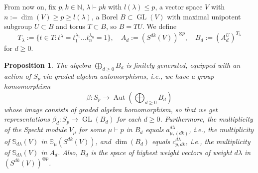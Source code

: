 \documentclass[a4paper]{amsart}
\newtheorem{proposition}{Proposition}
\def\N{{\mathbb{N}}}
\DeclareMathOperator{\GL}{\mathrm{GL}}
\DeclareMathOperator{\Aut}{\mathrm{Aut}}
\begin{document}
From now on, fix $p,k\in\N$, $\lambda\vdash pk$ with $l(\lambda)\leq p$, a vector space $V$ with $n:=\dim(V)\geq p\geq l(\lambda)$, a Borel $B\subset\GL(V)$ with maximal unipotent subgroup $U\subset B$ and torus $T\subset B$, so $B=TU$.
We define
\begin{displaymath}
	T_\lambda:=\{t\in T:t^\lambda=t_1^{\lambda_1}\ldots t_n^{\lambda_n}=1\},\quad
	A_d:=(S^{dk}(V))^{\otimes p},\quad
	B_d:=(A_d^U)^{T_\lambda}
\end{displaymath}
for $d\geq0$.
\begin{proposition}\label{connection:prop1}
	The algebra $\bigoplus_{d\geq0}B_d$
	is finitely generated,
	equipped with an action of $S_p$ via graded algebra automorphisms, i.e., we have a group homomorphism
	\begin{displaymath}
		\beta:S_p\to\Aut(\bigoplus_{d\geq 0}B_d)
	\end{displaymath}
	whose image consists of graded algebra homomorphism,
	so that we get representations $\beta_d:S_p\to\GL(B_d)$ for each $d\geq 0$.
	Furthermore,
	the multiplicity of the Specht module $V_\mu$ for some $\mu\vdash p$ in $B_d$ equals $a_{\mu,(dk)}^{d\lambda}$,
	i.e., the multiplicity of $\mathbb{S}_{d\lambda}(V)$ in $\mathbb{S}_\mu(S^{dk}(V))$, and $\dim(B_d)$ equals $c_{p,dk}^{d\lambda}$, i.e., the multiplicity of $\mathbb{S}_{d\lambda}(V)$ in $A_d$.
	Also, $B_d$ is the space of highest weight vectors of weight $d\lambda$ in $(S^{dk}(V))^{\otimes p}$.
\end{proposition}
\end{document}
